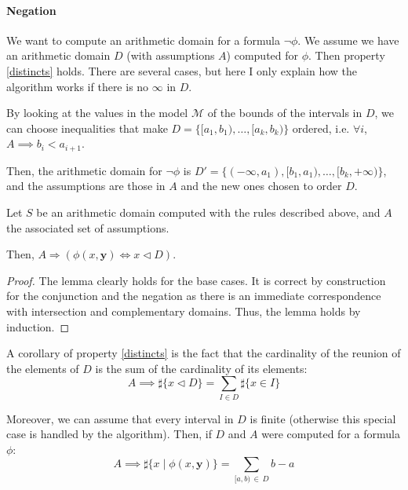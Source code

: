 \paragraph{Negation}
We want to compute an arithmetic domain for a formula $\lnot \phi$. We assume we have an arithmetic
domain $D$ (with assumptions $A$) computed for $\phi$. Then property \ref{distincts} holds. There
are several cases, but here I only explain how the algorithm works if there is no $\infty$ in $D$.

By looking at the values in the model $\mathcal{M}$ of the bounds of the intervals in $D$, we can
choose inequalities that make $D = \{[a_1, b_1), \ldots, [a_k, b_k)\}$ ordered, i.e. $\forall i$, $A
\implies b_i < a_{i+1}$.

Then, the arithmetic domain for $\lnot \phi$ is $D' = \{(-\infty, a_1), [b_1, a_1), \ldots, [b_k,
+\infty)\}$, and the assumptions are those in $A$ and the new ones chosen to order $D$.


\begin{lemma}[Correctness]

Let $S$ be an arithmetic domain computed with the rules described above, and $A$ the associated set of assumptions.

Then,
$A \Rightarrow \left(\phi(x, \mathbf{y}) \iff x \lhd D\right)$.

\label{correctness-interpretation}

\end{lemma}

\begin{proof}
The lemma clearly holds for the base cases. It is correct by construction for the conjunction and the negation as there is an immediate correspondence with intersection and complementary domains.
Thus, the lemma holds by induction.
\end{proof}




A corollary of property \ref{distincts} is the fact that the cardinality of the reunion of the elements
of $D$ is the sum of the cardinality of its elements:
\begin{equation}
A \implies \sharp\{ x \lhd D \} = \sum\limits_{I \in D} \sharp\{x \in I\}
\end{equation}

Moreover, we can assume that every interval in $D$ is finite (otherwise this
special case is handled by the algorithm). Then, if $D$ and $A$
were computed for a formula $\phi$:
\begin{equation}
A \implies \sharp\{x \mid \phi(x, \mathbf{y})\} = \sum\limits_{[a, b)\, \in\, D} b - a
\end{equation}


